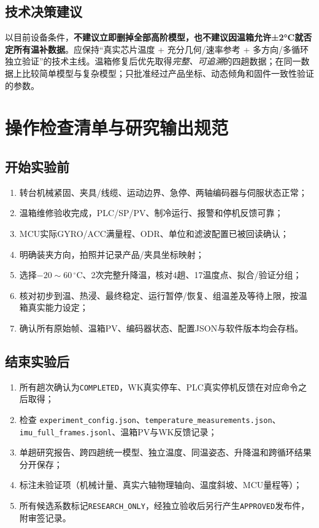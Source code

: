 \documentclass[UTF8,a4paper,11pt,oneside,openany,fontset=none]{ctexbook}
\newcommand{\degc}{\,^{\circ}\mathrm C}
\begin{document}
\section{技术决策建议}
以目前设备条件，\textbf{不建议立即删掉全部高阶模型，也不建议因温箱允许±2°C就否定所有温补数据}。应保持“真实芯片温度 + 充分几何/速率参考 + 多方向/多循环独立验证”的技术主线。温箱修复后优先取得\emph{完整、可追溯}的四趟数据；在同一数据上比较简单模型与复杂模型；只批准经过产品坐标、动态倾角和固件一致性验证的参数。

\chapter{操作检查清单与研究输出规范}
\section{开始实验前}
\begin{enumerate}
\item 转台机械紧固、夹具/线缆、运动边界、急停、两轴编码器与伺服状态正常；
\item 温箱维修验收完成，PLC/SP/PV、制冷运行、报警和停机反馈可靠；
\item MCU实际GYRO/ACC满量程、ODR、单位和滤波配置已被回读确认；
\item 明确装夹方向，拍照并记录产品/夹具坐标映射；
\item 选择$-20\sim60\degc$、2次完整升降温，核对4趟、17温度点、拟合/验证分组；
\item 核对初步到温、热浸、最终稳定、运行暂停/恢复、组温差及等待上限，按温箱真实能力设定；
\item 确认所有原始帧、温箱PV、编码器状态、配置JSON与软件版本均会存档。
\end{enumerate}

\section{结束实验后}
\begin{enumerate}
\item 所有趟次确认为\texttt{COMPLETED}，WK真实停车、PLC真实停机反馈在对应命令之后取得；
\item 检查 \texttt{experiment\_config.json}、\texttt{temperature\_measurements.json}、\texttt{imu\_full\_frames.jsonl}、温箱PV与WK反馈记录；
\item 单趟研究报告、跨四趟统一模型、独立温度、同温姿态、升降温和跨循环结果分开保存；
\item 标注未验证项（机械计量、真实六轴物理轴向、温度斜坡、MCU量程等）；
\item 所有候选系数标记\texttt{RESEARCH\_ONLY}，经独立验收后另行产生\texttt{APPROVED}发布件，附审签记录。
\end{enumerate}
\end{document}
